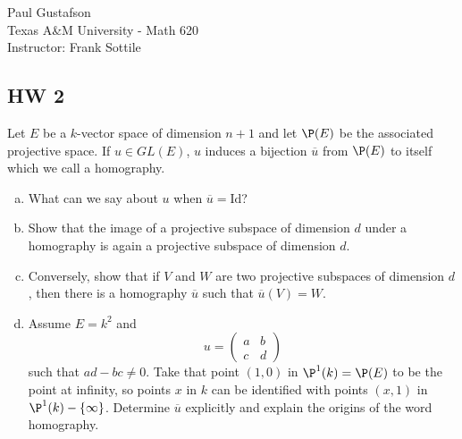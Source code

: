\documentclass{article}
\begin{document}
\noindent Paul Gustafson\\
\noindent Texas A\&M University - Math 620\\ 
\noindent Instructor: Frank Sottile

\subsection*{HW 2}


 Let $E$ be a $k$-vector space of dimension $n + 1$ and let $\P(E)$ be the associated projective space. If $u \in GL(E)$, $u$ induces a bijection $\overline{u}$ from $\P(E)$ to itself which we call a homography.
\begin{enumerate}[a)]
\item What can we say about $u$ when $\overline u = \mathrm{Id}$?
\item Show that the image of a projective subspace of dimension $d$ under a homography is again a projective subspace of dimension $d$.
\item Conversely, show that if $V$ and $W$ are two projective subspaces of dimension $d$, then there is a homography $\overline u$ such that $\overline u (V) = W$.
\item Assume $E = k^2$ and 
$$ u = \begin{pmatrix}
a & b \\
c & d 
\end{pmatrix}
$$
such that $ad - bc \neq 0$.  Take that point $(1,0)$ in $\P^1(k) = \P(E)$ to be the point at infinity, so points $x$ in $k$ can be identified with points $(x,1)$ in $\P^1(k) - \{\infty\}$. Determine $\overline u$ explicitly and explain the origins of the word homography.
\end{enumerate}
\end{document}

